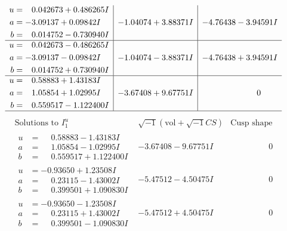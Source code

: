 \documentclass[1p]{elsarticle_modified}
\theoremstyle{definition}
\newcommand{\I}{\sqrt{-1}}
\begin{document}
$$\begin{array}{c|c|c}
\begin{aligned}
u &= \phantom{-}0.042673 + 0.486265 I \\
a &= -3.09137 + 0.09842 I \\
b &= \phantom{-}0.014752 - 0.730940 I\end{aligned}
 & -1.04074 + 3.88371 I & -4.76438 - 3.94591 I \\ \hline\begin{aligned}
u &= \phantom{-}0.042673 - 0.486265 I \\
a &= -3.09137 - 0.09842 I \\
b &= \phantom{-}0.014752 + 0.730940 I\end{aligned}
 & -1.04074 - 3.88371 I & -4.76438 + 3.94591 I \\ \hline\begin{aligned}
u &= \phantom{-}0.58883 + 1.43183 I \\
a &= \phantom{-}1.05854 + 1.02995 I \\
b &= \phantom{-}0.559517 - 1.122400 I\end{aligned}
 & -3.67408 + 9.67751 I & \phantom{-0.000000 } 0\\
 \hline 
 \end{array}$$\newpage$$\begin{array}{c|c|c}  
\text{Solutions to }I^u_{1}& \I (\text{vol} + \sqrt{-1}CS) & \text{Cusp shape}\\
 \hline 
\begin{aligned}
u &= \phantom{-}0.58883 - 1.43183 I \\
a &= \phantom{-}1.05854 - 1.02995 I \\
b &= \phantom{-}0.559517 + 1.122400 I\end{aligned}
 & -3.67408 - 9.67751 I & \phantom{-0.000000 } 0 \\ \hline\begin{aligned}
u &= -0.93650 + 1.23508 I \\
a &= \phantom{-}0.23115 - 1.43002 I \\
b &= \phantom{-}0.399501 + 1.090830 I\end{aligned}
 & -5.47512 - 4.50475 I & \phantom{-0.000000 } 0 \\ \hline\begin{aligned}
u &= -0.93650 - 1.23508 I \\
a &= \phantom{-}0.23115 + 1.43002 I \\
b &= \phantom{-}0.399501 - 1.090830 I\end{aligned}
 & -5.47512 + 4.50475 I & \phantom{-0.000000 } 0 \\ \hline\begin{aligned}

\end{aligned}
\end{array}$$
\end{document}
